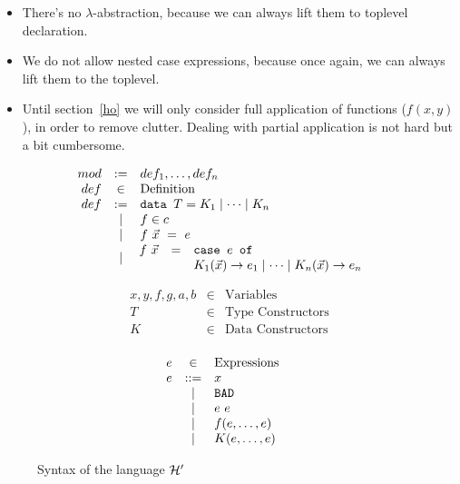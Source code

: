 \documentclass[preprint]{sigplanconf}
\begin{document}
\begin{itemize}
\item There's no $\lambda$-abstraction, because we can always lift
  them to toplevel declaration.
\item We do not allow nested case expressions, because once again, we
  can always lift them to the toplevel.
\item Until section~\ref{ho} we will only consider full application of
  functions ($f(x,y)$), in order to remove clutter. Dealing with
  partial application is not hard but a bit cumbersome.
\end{itemize}

\begin{figure}[h]
  \centering
  \[
  \begin{array}{rclr}
    mod &:=& def_1,\dots,def_n &\\
    def &\in& \mbox{Definition} & \\
    def &:=& \texttt{data } T = K_1 \mid \cdots \mid K_n & \\
    &\mid& f \in c & \\
    &\mid& f~\vec{x}~=~e & \\
    &\mid& \hspace{-0.2cm}
       \begin{array}{rcl}
         f~\vec{x} &=& \texttt{case } e \texttt{ of } \\
         && K_1(\vec{x}) \to e_1 \mid \cdots \mid K_n(\vec{x}) \to e_n \\
       \end{array} & \\
  \end{array} \]
  
  \[  \begin{array}{rclr}
    x,y,f,g,a,b & \in & \mbox{Variables} \\
    T &\in& \mbox{Type Constructors} \\
    K &\in& \mbox{Data Constructors} \\
  \end{array} \]

  \[  \begin{array}{rclr}
    e &\in& \mbox{Expressions} & \\
    e &::=& x & \\
    &\mid& \texttt{BAD} & \\
    &\mid& e~e & \\
    &\mid& f(e,\dots,e) & \\
    &\mid& K(e,\dots,e) & \\
  \end{array} \]

\caption{Syntax of the language $\mathcal{H}'$}
\label{hprime-stx}
\end{figure}
\end{document}
